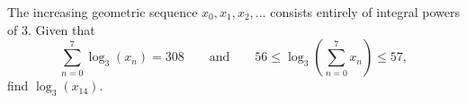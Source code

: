 The increasing geometric sequence $x_{0},x_{1},x_{2},\ldots$ consists entirely of integral powers of $3.$ Given that \[\sum_{n=0}^{7}\log_{3}(x_{n}) = 308\qquad\text{and}\qquad 56 \leq \log_{3}\left ( \sum_{n=0}^{7}x_{n}\right ) \leq 57,\] find $\log_{3}(x_{14}).$